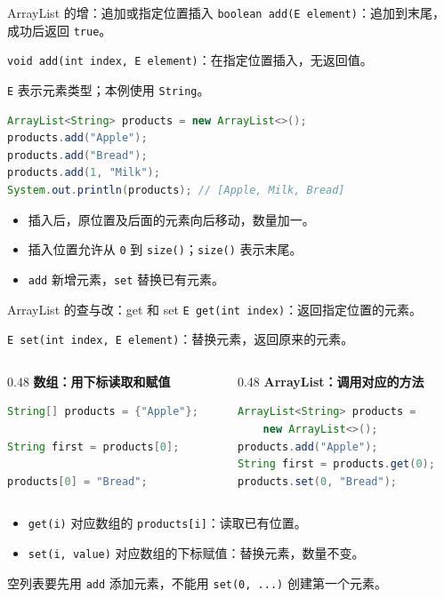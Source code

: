 \documentclass[aspectratio=169]{beamer}
\begin{document}
\begin{frame}[fragile]{ArrayList 的增：追加或指定位置插入}
  \texttt{boolean add(E element)}：追加到末尾，成功后返回 \texttt{true}。
  \par
  \texttt{void add(int index, E element)}：在指定位置插入，无返回值。
  \par\medskip
  \texttt{E} 表示元素类型；本例使用 \texttt{String}。
  \begin{lstlisting}[language=Java]
ArrayList<String> products = new ArrayList<>();
products.add("Apple");
products.add("Bread");
products.add(1, "Milk");
System.out.println(products); // [Apple, Milk, Bread]
  \end{lstlisting}
  \begin{itemize}
    \item 插入后，原位置及后面的元素向后移动，数量加一。
    \item 插入位置允许从 \texttt{0} 到 \texttt{size()}；\texttt{size()} 表示末尾。
    \item \texttt{add} 新增元素，\texttt{set} 替换已有元素。
  \end{itemize}
\end{frame}

\begin{frame}[fragile]{ArrayList 的查与改：get 和 set}
  \texttt{E get(int index)}：返回指定位置的元素。
  \par
  \texttt{E set(int index, E element)}：替换元素，返回原来的元素。
  \par\medskip
  \begin{columns}[T,onlytextwidth]
    \begin{column}{0.48\textwidth}
      \textbf{数组：用下标读取和赋值}
      \begin{lstlisting}[language=Java]
String[] products = {"Apple"};

String first = products[0];

products[0] = "Bread";
      \end{lstlisting}
    \end{column}
    \begin{column}{0.48\textwidth}
      \textbf{ArrayList：调用对应的方法}
      \begin{lstlisting}[language=Java]
ArrayList<String> products =
    new ArrayList<>();
products.add("Apple");
String first = products.get(0);
products.set(0, "Bread");
      \end{lstlisting}
    \end{column}
  \end{columns}
  \medskip
  \begin{itemize}
    \item \texttt{get(i)} 对应数组的 \texttt{products[i]}：读取已有位置。
    \item \texttt{set(i, value)} 对应数组的下标赋值：替换元素，数量不变。
  \end{itemize}
  空列表要先用 \texttt{add} 添加元素，不能用 \texttt{set(0, ...)} 创建第一个元素。
\end{frame}
\end{document}
